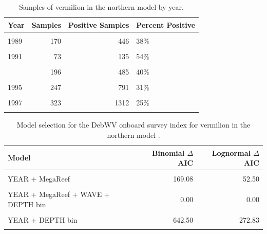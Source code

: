 \documentclass[11pt,
  english,
  a4paper,
]{article}
\begin{document}
\begin{table}

\caption{\label{tab:tab-year-debwv}Samples of vermilion in the northern model by year.}
\centering
\begin{tabular}[t]{lrrl}
\toprule
Year & Samples & Positive Samples & Percent Positive\\
\midrule
\cellcolor{gray!6}{1988} & \cellcolor{gray!6}{136} & \cellcolor{gray!6}{422} & \cellcolor{gray!6}{32\%}\\
1989 & 170 & 446 & 38\%\\
\cellcolor{gray!6}{1990} & \cellcolor{gray!6}{65} & \cellcolor{gray!6}{122} & \cellcolor{gray!6}{53\%}\\
1991 & 73 & 135 & 54\%\\
\cellcolor{gray!6}{1992} & \cellcolor{gray!6}{168} & \cellcolor{gray!6}{467} & \cellcolor{gray!6}{36\%}\\
\addlinespace
1993 & 196 & 485 & 40\%\\
\cellcolor{gray!6}{1994} & \cellcolor{gray!6}{189} & \cellcolor{gray!6}{555} & \cellcolor{gray!6}{34\%}\\
1995 & 247 & 791 & 31\%\\
\cellcolor{gray!6}{1996} & \cellcolor{gray!6}{238} & \cellcolor{gray!6}{963} & \cellcolor{gray!6}{25\%}\\
1997 & 323 & 1312 & 25\%\\
\addlinespace
\cellcolor{gray!6}{1998} & \cellcolor{gray!6}{211} & \cellcolor{gray!6}{899} & \cellcolor{gray!6}{23\%}\\
\bottomrule
\end{tabular}
\end{table}

\FloatBarrier

\begin{table}

\caption{\label{tab:tab-model-select-debwv}Model selection for the DebWV onboard survey index for vermilion in the northern model .}
\centering
\begin{tabular}[t]{lrr}
\toprule
Model & Binomial $\Delta$AIC & Lognormal $\Delta$AIC\\
\midrule
\cellcolor{gray!6}{1} & \cellcolor{gray!6}{1011.38} & \cellcolor{gray!6}{422.42}\\
YEAR + MegaReef & 169.08 & 52.50\\
\cellcolor{gray!6}{YEAR + MegaReef + WAVE} & \cellcolor{gray!6}{120.32} & \cellcolor{gray!6}{42.13}\\
YEAR + MegaReef + WAVE + DEPTH bin & 0.00 & 0.00\\
\cellcolor{gray!6}{YEAR + WAVE + DEPTH bin} & \cellcolor{gray!6}{611.73} & \cellcolor{gray!6}{260.44}\\
\addlinespace
YEAR + DEPTH bin & 642.50 & 272.83\\
\cellcolor{gray!6}{YEAR + MegaReef + DEPTH bin} & \cellcolor{gray!6}{55.30} & \cellcolor{gray!6}{7.28}\\
\bottomrule
\end{tabular}
\end{table}
\end{document}
